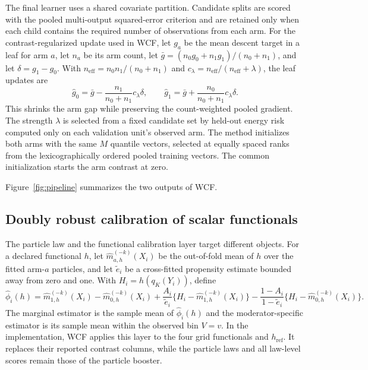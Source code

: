 \documentclass[11pt]{article}
\begin{document}
The final learner uses a shared covariate partition. Candidate splits are
scored with the pooled multi-output squared-error criterion and are retained
only when each child contains the required number of observations from each
arm. For the contrast-regularized update used in WCF, let $g_a$ be the
mean descent target in a leaf for arm $a$, let $n_a$ be its arm count, let
$\bar g=(n_0g_0+n_1g_1)/(n_0+n_1)$, and let $\delta=g_1-g_0$. With
$n_{\mathrm{eff}}=n_0n_1/(n_0+n_1)$ and
$c_\lambda=n_{\mathrm{eff}}/(n_{\mathrm{eff}}+\lambda)$, the leaf updates are
\[
 \widehat g_0=\bar g-\frac{n_1}{n_0+n_1}c_\lambda\delta,
 \qquad
 \widehat g_1=\bar g+\frac{n_0}{n_0+n_1}c_\lambda\delta.
\]
This shrinks the arm gap while preserving the count-weighted pooled gradient.
The strength $\lambda$ is selected from a fixed candidate set by held-out
energy risk computed only on each validation unit's observed arm. The method
initializes both arms with the same $M$ quantile vectors, selected at equally spaced ranks from the lexicographically ordered pooled training vectors. The common initialization starts the arm contrast at zero.

Figure~\ref{fig:pipeline} summarizes the two outputs of WCF.


\subsection{Doubly robust calibration of scalar functionals}\label{sec:dr}

The particle law and the functional calibration layer target different
objects. For a declared functional $h$, let $\widehat m_{a,h}^{(-k)}(X_i)$
be the out-of-fold mean of $h$ over the fitted arm-$a$ particles, and let
$\widetilde e_i$ be a cross-fitted propensity estimate bounded away from zero and one. With $H_i=h(q_K(Y_i))$, define
\[
 \widehat\phi_i(h)=\widehat m_{1,h}^{(-k)}(X_i)
 -\widehat m_{0,h}^{(-k)}(X_i)
 +\frac{A_i}{\widetilde e_i}
   \{H_i-\widehat m_{1,h}^{(-k)}(X_i)\}
 -\frac{1-A_i}{1-\widetilde e_i}
   \{H_i-\widehat m_{0,h}^{(-k)}(X_i)\}.
\]
The marginal estimator is the sample mean of $\widehat\phi_i(h)$ and the
moderator-specific estimator is its sample mean within the observed bin
$V=v$. In the implementation, WCF applies this layer to the four grid
functionals and $h_{\mathrm{ref}}$. It replaces their reported contrast
columns, while the particle laws and all law-level scores remain those of the
particle booster.
\end{document}
